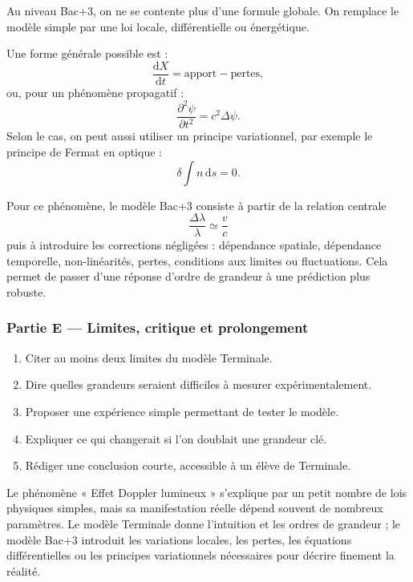 \documentclass[11pt,a4paper]{article}
\begin{document}
\begin{approfondissementbox}
Au niveau Bac+3, on ne se contente plus d'une formule globale. On remplace le modèle simple par une loi locale, différentielle ou énergétique.

Une forme générale possible est :
\[
\frac{\mathrm d X}{\mathrm dt}=\text{apport}-\text{pertes},
\]
ou, pour un phénomène propagatif :
\[
\frac{\partial^2 \psi}{\partial t^2}=c^2\Delta\psi.
\]
Selon le cas, on peut aussi utiliser un principe variationnel, par exemple le principe de Fermat en optique :
\[
\delta \int n\,\mathrm ds=0.
\]

Pour ce phénomène, le modèle Bac+3 consiste à partir de la relation centrale
\[
\frac{\Delta\lambda}{\lambda}\simeq\frac{v}{c}
\]
puis à introduire les corrections négligées : dépendance spatiale, dépendance temporelle, non-linéarités, pertes, conditions aux limites ou fluctuations. Cela permet de passer d'une réponse d'ordre de grandeur à une prédiction plus robuste.
\end{approfondissementbox}

\subsubsection*{Partie E — Limites, critique et prolongement}

\begin{enumerate}
  \item Citer au moins deux limites du modèle Terminale.
  \item Dire quelles grandeurs seraient difficiles à mesurer expérimentalement.
  \item Proposer une expérience simple permettant de tester le modèle.
  \item Expliquer ce qui changerait si l'on doublait une grandeur clé.
  \item Rédiger une conclusion courte, accessible à un élève de Terminale.
\end{enumerate}

\begin{corrigebox}
Le phénomène « Effet Doppler lumineux » s'explique par un petit nombre de lois physiques simples, mais sa manifestation réelle dépend souvent de nombreux paramètres. Le modèle Terminale donne l'intuition et les ordres de grandeur ; le modèle Bac+3 introduit les variations locales, les pertes, les équations différentielles ou les principes variationnels nécessaires pour décrire finement la réalité.
\end{corrigebox}
\end{document}
